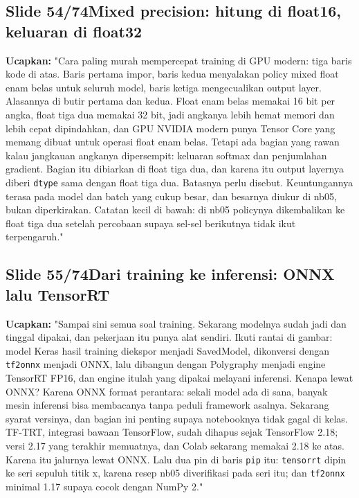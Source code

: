 \documentclass[11pt]{article}
\renewcommand{\framebox}[1]{\colorbox{acc!15}{\textcolor{acc}{\textbf{#1}}}}
\begin{document}
\subsection*{\framebox{Slide 54/74}\quad Mixed precision: hitung di float16, keluaran di float32}
\textbf{Ucapkan:} "Cara paling murah mempercepat training di GPU modern: tiga baris kode di atas. Baris pertama impor, baris kedua menyalakan policy mixed float enam belas untuk seluruh model, baris ketiga mengecualikan output layer. Alasannya di butir pertama dan kedua. Float enam belas memakai 16 bit per angka, float tiga dua memakai 32 bit, jadi angkanya lebih hemat memori dan lebih cepat dipindahkan, dan GPU NVIDIA modern punya Tensor Core yang memang dibuat untuk operasi float enam belas. Tetapi ada bagian yang rawan kalau jangkauan angkanya dipersempit: keluaran softmax dan penjumlahan gradient. Bagian itu dibiarkan di float tiga dua, dan karena itu output layernya diberi \texttt{dtype} sama dengan float tiga dua. Batasnya perlu disebut. Keuntungannya terasa pada model dan batch yang cukup besar, dan besarnya diukur di nb05, bukan diperkirakan. Catatan kecil di bawah: di nb05 policynya dikembalikan ke float tiga dua setelah percobaan supaya sel-sel berikutnya tidak ikut terpengaruh."\\[2pt]

\subsection*{\framebox{Slide 55/74}\quad Dari training ke inferensi: ONNX lalu TensorRT}
\textbf{Ucapkan:} "Sampai sini semua soal training. Sekarang modelnya sudah jadi dan tinggal dipakai, dan pekerjaan itu punya alat sendiri. Ikuti rantai di gambar: model Keras hasil training diekspor menjadi SavedModel, dikonversi dengan \texttt{tf2onnx} menjadi ONNX, lalu dibangun dengan Polygraphy menjadi engine TensorRT FP16, dan engine itulah yang dipakai melayani inferensi. Kenapa lewat ONNX? Karena ONNX format perantara: sekali model ada di sana, banyak mesin inferensi bisa membacanya tanpa peduli framework asalnya. Sekarang syarat versinya, dan bagian ini penting supaya notebooknya tidak gagal di kelas. TF-TRT, integrasi bawaan TensorFlow, sudah dihapus sejak TensorFlow 2.18; versi 2.17 yang terakhir memuatnya, dan Colab sekarang memakai 2.18 ke atas. Karena itu jalurnya lewat ONNX. Lalu dua pin di baris \texttt{pip} itu: \texttt{tensorrt} dipin ke seri sepuluh titik x, karena resep nb05 diverifikasi pada seri itu; dan \texttt{tf2onnx} minimal 1.17 supaya cocok dengan NumPy 2."\\[2pt]
\end{document}
